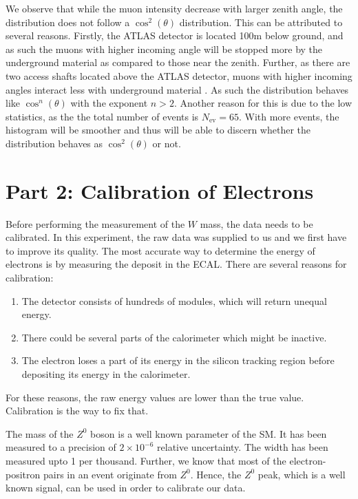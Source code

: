 \documentclass[a4paper]{report}
\numberwithin{equation}{section}
\begin{document}
We observe that while the muon intensity decrease with larger zenith angle, 
the distribution does not follow a $\cos^2 (\theta)$ distribution. This can be attributed to several reasons. Firstly, the ATLAS detector 
is located 100m below ground, and as such the muons with higher incoming angle will be stopped more by the underground material 
as compared to those near the zenith. Further, as there are two access shafts located above the ATLAS detector, muons with higher 
incoming angles interact less with underground material  \cite{Aad2011}. As such the distribution behaves like $\cos^n (\theta)$ with 
the exponent $n > 2$. Another reason for this is due to the low statistics, as the the total number of events is $N_{\mathrm{ev}} = 65$. 
With more events, the histogram will be smoother and thus will be able to discern whether the distribution behaves as $\cos^2(\theta)$
or not.\par 


\section{Part 2: Calibration of Electrons}

Before performing the measurement of the $W$ mass, the data needs to be calibrated. In this experiment, the raw data was supplied to us and we first have to improve its quality. The most accurate way to determine the energy of electrons is by measuring the deposit in the ECAL. There are several reasons for calibration:

\begin{enumerate}
	\item The detector consists of hundreds of modules, which will return unequal energy. 
	\item There could be several parts of the calorimeter which might be inactive. 
	\item The electron loses a part of its energy in the silicon tracking region before depositing its energy in the calorimeter. 
\end{enumerate}
For these reasons, the raw energy values are lower than the true value. Calibration is the way to fix that. 

The mass of the $Z^0$ boson is a well known parameter of the SM. It has been measured to a precision of $2 \times 10^{-6}$ relative uncertainty. The width has been measured upto 1 per thousand. Further, we know that most of the electron-positron pairs in an event originate from $Z^0$. Hence, the $Z^0$ peak, which is a well known signal, can be used in order to calibrate our data. 
\end{document}
